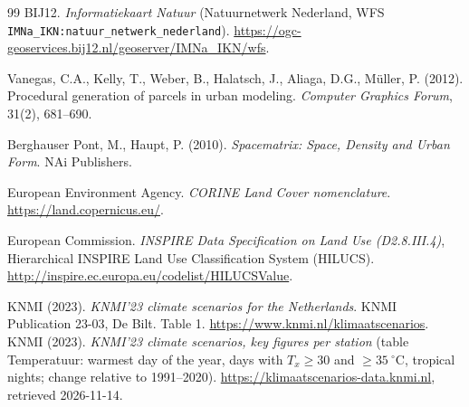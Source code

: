 \documentclass[11pt]{article}
\newcommand{\code}[1]{\texttt{#1}}
\begin{document}
\begin{thebibliography}{99}
 BIJ12. \textit{Informatiekaart Natuur} (Natuurnetwerk Nederland, WFS \code{IMNa\_IKN:natuur\_netwerk\_nederland}). \url{https://ogc-geoservices.bij12.nl/geoserver/IMNa_IKN/wfs}.

 Vanegas, C.A., Kelly, T., Weber, B., Halatsch, J., Aliaga, D.G., M\"uller, P. (2012). Procedural generation of parcels in urban modeling. \textit{Computer Graphics Forum}, 31(2), 681--690.

 Berghauser Pont, M., Haupt, P. (2010). \textit{Spacematrix: Space, Density and Urban Form}. NAi Publishers.

 European Environment Agency. \textit{CORINE Land Cover nomenclature}. \url{https://land.copernicus.eu/}.

 European Commission. \textit{INSPIRE Data Specification on Land Use (D2.8.III.4)}, Hierarchical INSPIRE Land Use Classification System (HILUCS). \url{http://inspire.ec.europa.eu/codelist/HILUCSValue}.

 KNMI (2023). \textit{KNMI'23 climate scenarios for the Netherlands}. KNMI Publication 23-03, De Bilt. Table 1. \url{https://www.knmi.nl/klimaatscenarios}.
 KNMI (2023). \textit{KNMI'23 climate scenarios, key figures per station} (table Temperatuur: warmest day of the year, days with $T_x \geq 30$ and $\geq 35~^\circ$C, tropical nights; change relative to 1991--2020). \url{https://klimaatscenarios-data.knmi.nl}, retrieved 2026-11-14.
\end{thebibliography}
\end{document}
